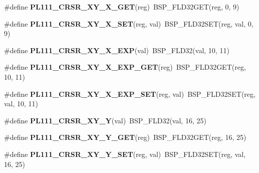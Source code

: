 \begin{DoxyCompactItemize}
\item 
\mbox{\label{arm-pl111-regs_8h_abcceae94a5556ea3abc051b7860e9b8c}} 
\#define {\bfseries P\+L111\+\_\+\+C\+R\+S\+R\+\_\+\+X\+Y\+\_\+\+X\+\_\+\+G\+ET}(reg)~B\+S\+P\+\_\+\+F\+L\+D32\+G\+ET(reg, 0, 9)
\item 
\mbox{\label{arm-pl111-regs_8h_a63422e41bf2f464a743544dcc161f972}} 
\#define {\bfseries P\+L111\+\_\+\+C\+R\+S\+R\+\_\+\+X\+Y\+\_\+\+X\+\_\+\+S\+ET}(reg,  val)~B\+S\+P\+\_\+\+F\+L\+D32\+S\+ET(reg, val, 0, 9)
\item 
\mbox{\label{arm-pl111-regs_8h_af11ff7da6102d2e3e4c4dbfa6bf27249}} 
\#define {\bfseries P\+L111\+\_\+\+C\+R\+S\+R\+\_\+\+X\+Y\+\_\+\+X\+\_\+\+E\+XP}(val)~B\+S\+P\+\_\+\+F\+L\+D32(val, 10, 11)
\item 
\mbox{\label{arm-pl111-regs_8h_a71ae46547bcdcfe2462a77f8833c947f}} 
\#define {\bfseries P\+L111\+\_\+\+C\+R\+S\+R\+\_\+\+X\+Y\+\_\+\+X\+\_\+\+E\+X\+P\+\_\+\+G\+ET}(reg)~B\+S\+P\+\_\+\+F\+L\+D32\+G\+ET(reg, 10, 11)
\item 
\mbox{\label{arm-pl111-regs_8h_a7d4476ec1c5bc969cb6520a0f2939aa6}} 
\#define {\bfseries P\+L111\+\_\+\+C\+R\+S\+R\+\_\+\+X\+Y\+\_\+\+X\+\_\+\+E\+X\+P\+\_\+\+S\+ET}(reg,  val)~B\+S\+P\+\_\+\+F\+L\+D32\+S\+ET(reg, val, 10, 11)
\item 
\mbox{\label{arm-pl111-regs_8h_acc879ecd5953cda7cbd3010fbc94a663}} 
\#define {\bfseries P\+L111\+\_\+\+C\+R\+S\+R\+\_\+\+X\+Y\+\_\+Y}(val)~B\+S\+P\+\_\+\+F\+L\+D32(val, 16, 25)
\item 
\mbox{\label{arm-pl111-regs_8h_a95024878634997303b44d2a4325cefe8}} 
\#define {\bfseries P\+L111\+\_\+\+C\+R\+S\+R\+\_\+\+X\+Y\+\_\+\+Y\+\_\+\+G\+ET}(reg)~B\+S\+P\+\_\+\+F\+L\+D32\+G\+ET(reg, 16, 25)
\item 
\mbox{\label{arm-pl111-regs_8h_a3d95b7b82a100c130bf1b4cf51acbb12}} 
\#define {\bfseries P\+L111\+\_\+\+C\+R\+S\+R\+\_\+\+X\+Y\+\_\+\+Y\+\_\+\+S\+ET}(reg,  val)~B\+S\+P\+\_\+\+F\+L\+D32\+S\+ET(reg, val, 16, 25)
\item 
\mbox{\label{arm-pl111-regs_8h_a340e4725097ec7c86ae5e3572fffcd98}} 

\end{DoxyCompactItemize}
